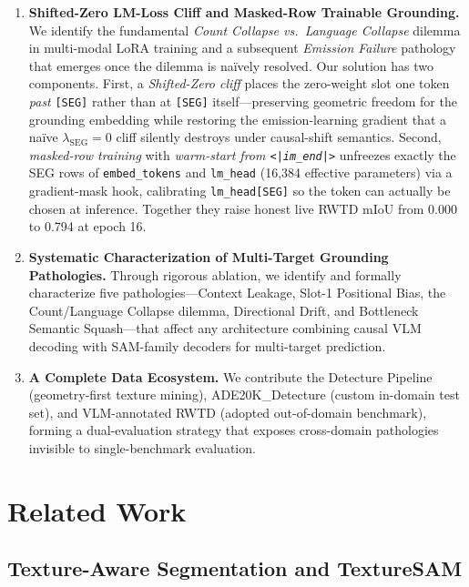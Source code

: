\documentclass{article}
\begin{document}
\begin{enumerate}
    \item \textbf{Shifted-Zero LM-Loss Cliff and Masked-Row Trainable Grounding.} We identify the fundamental \emph{Count Collapse vs.\ Language Collapse} dilemma in multi-modal LoRA training and a subsequent \emph{Emission Failure} pathology that emerges once the dilemma is na\"ively resolved. Our solution has two components. First, a \emph{Shifted-Zero cliff} places the zero-weight slot one token \emph{past} \texttt{[SEG]} rather than at \texttt{[SEG]} itself---preserving geometric freedom for the grounding embedding while restoring the emission-learning gradient that a na\"ive $\lambda_{\text{SEG}} = 0$ cliff silently destroys under causal-shift semantics. Second, \emph{masked-row training} with \emph{warm-start from \texttt{<|im\_end|>}} unfreezes exactly the SEG rows of \texttt{embed\_tokens} and \texttt{lm\_head} (16{,}384 effective parameters) via a gradient-mask hook, calibrating \texttt{lm\_head[SEG]} so the token can actually be chosen at inference. Together they raise honest live RWTD mIoU from 0.000 to 0.794 at epoch 16.

    \item \textbf{Systematic Characterization of Multi-Target Grounding Pathologies.} Through rigorous ablation, we identify and formally characterize five pathologies---Context Leakage, Slot-1 Positional Bias, the Count/Language Collapse dilemma, Directional Drift, and Bottleneck Semantic Squash---that affect any architecture combining causal VLM decoding with SAM-family decoders for multi-target prediction.

    \item \textbf{A Complete Data Ecosystem.} We contribute the Detecture Pipeline (geometry-first texture mining), ADE20K\_Detecture (custom in-domain test set), and VLM-annotated RWTD (adopted out-of-domain benchmark), forming a dual-evaluation strategy that exposes cross-domain pathologies invisible to single-benchmark evaluation.
\end{enumerate}

\section{Related Work}

\subsection{Texture-Aware Segmentation and TextureSAM}
\end{document}
